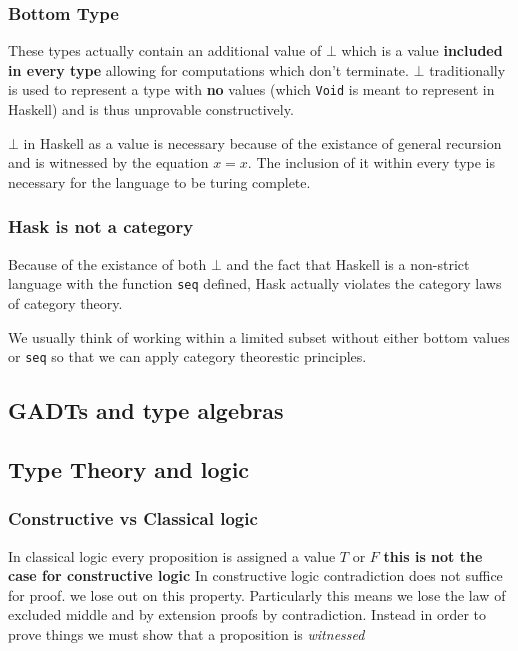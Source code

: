 \documentclass{article}
\begin{document}
  \bigskip

  \subsubsection{Bottom Type}
  These types actually contain an additional value of $\bot$ which is a value
  \textbf{included in every type} allowing for computations which don't
  terminate. $\bot$ traditionally is used to represent a type with \textbf{no}
  values (which \verb|Void| is meant to represent in Haskell) and is thus
  unprovable constructively.
  \bigskip

  $\bot$ in Haskell as a value is necessary because of the existance of general
  recursion and is witnessed by the equation $x = x$. The inclusion of it
  within every type is necessary for the language to be turing complete.

  \subsubsection{Hask is not a category}
  \label{sec:Hask is not a category}
  Because of the existance of both $\bot$ and the fact that Haskell is a
  non-strict language with the function \verb|seq| defined, Hask actually
  violates the category laws of category theory.
  \bigskip

  We usually think of working within a limited subset without either bottom
  values or \verb|seq| so that we can apply category theorestic principles.

\subsection{GADTs and type algebras}

\subsection{Type Theory and logic}
\subsubsection{Constructive vs Classical logic}

  In classical  logic every proposition is assigned a value $T$ or $F$ 
   \textbf{this is not the case for constructive logic} In constructive logic
   contradiction does not suffice for proof.
   we lose out on this property. Particularly this means we lose the law of
   excluded middle and by extension proofs by contradiction. Instead in order
   to prove things we must show that a proposition is \textit{witnessed}
  \bigskip
\end{document}
